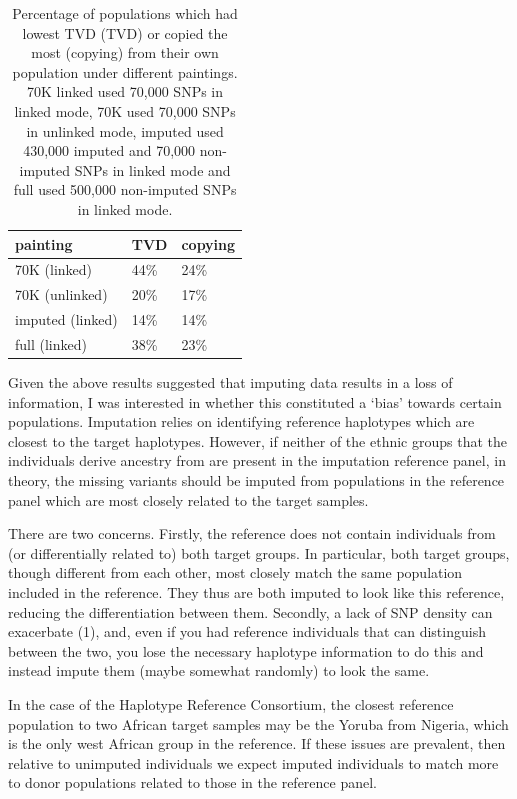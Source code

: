 \begin{table}
\centering
\small
\begin{tabular}{l|l|l}
\hline
painting & TVD & copying\\
\hline
70K (linked) & 44\% & 24\%\\
\hline
70K (unlinked) & 20\% & 17\%\\
\hline
imputed (linked) & 14\% & 14\%\\
\hline
full (linked) & 38\% & 23\%\\
\hline
\end{tabular}
\caption{Percentage of populations which had lowest TVD (TVD) or copied the most (copying) from their own population under different paintings. 70K linked used 70,000 SNPs in linked mode, 70K used 70,000 SNPs in unlinked mode, imputed used 430,000 imputed and 70,000 non-imputed SNPs in linked mode and full used 500,000 non-imputed SNPs in linked mode.}
\label{table:TVD_copying}
\end{table}


Given the above results suggested that imputing data results in a loss of information, I was interested in whether this constituted a `bias' towards certain populations. Imputation relies on identifying reference haplotypes which are closest to the target haplotypes. However, if neither of the ethnic groups that the individuals derive ancestry from are present in the imputation reference panel, in theory, the missing variants should be imputed from populations in the reference panel which are most closely related to the target samples. 

There are two concerns. Firstly, the reference does not contain individuals from (or differentially related to) both target groups. In particular, both target groups, though different from each other, most closely match the same population included in the reference. They thus are both imputed to look like this reference, reducing the differentiation between them. Secondly, a lack of SNP density can exacerbate (1), and, even if you had reference individuals that can distinguish between the two, you lose the necessary haplotype information to do this and instead impute them (maybe somewhat randomly) to look the same.


In the case of the Haplotype Reference Consortium, the closest reference population to two African target samples may be the Yoruba from Nigeria, which is the only west African group in the reference. If these issues are prevalent, then relative to unimputed individuals we expect imputed individuals to match more to donor populations related to those in the reference panel.


